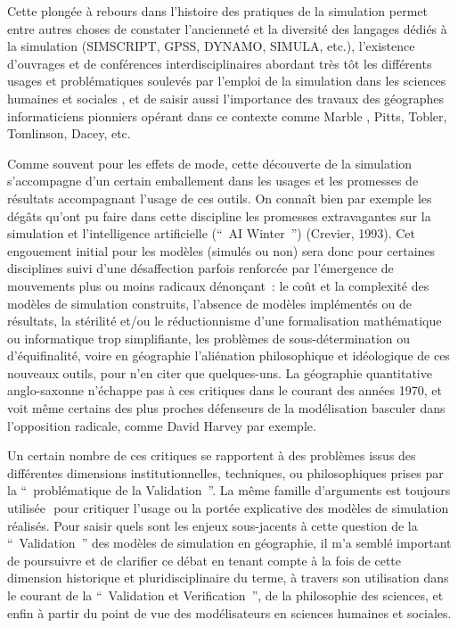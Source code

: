 Cette plongée à rebours dans l'histoire des pratiques de la simulation permet entre autres choses de constater l'ancienneté et la diversité des langages dédiés à la simulation (SIMSCRIPT, GPSS, DYNAMO, SIMULA, etc.), l'existence  d'ouvrages et de conférences interdisciplinaires abordant très tôt les différents usages et problématiques soulevés par l'emploi de la simulation dans les sciences humaines et sociales \autocites{Shubik1960, Borko1962, Guetzkow1962, Beshers1965, Guetzkow1972, Shubik1972, Morgan2004, Dutton1971}⁠⁠, et de saisir aussi l'importance des travaux des géographes informaticiens pionniers opérant dans ce contexte comme Marble , Pitts, Tobler, Tomlinson, Dacey, etc. \autocites{Marble2010, Marble1972}

Comme souvent pour les effets de mode, cette découverte de la simulation  s'accompagne d'un certain emballement dans les usages et les promesses de résultats accompagnant l'usage de ces outils. On connaît bien par exemple les dégâts qu'ont pu faire dans cette discipline les promesses extravagantes sur la simulation et l'intelligence artificielle (\foreignquote{english}{ AI Winter }) (Crevier, 1993). Cet engouement initial pour les modèles (simulés ou  non) sera donc pour certaines disciplines suivi d'une désaffection parfois renforcée par l'émergence de mouvements plus ou moins radicaux dénonçant : le coût et la complexité des modèles de simulation construits, l'absence de modèles implémentés ou de résultats, la stérilité et/ou le réductionnisme d'une formalisation mathématique ou informatique trop simplifiante, les problèmes de sous-détermination ou d'équifinalité, voire en géographie l'aliénation philosophique et idéologique de ces nouveaux outils, pour n'en citer que quelques-uns. La géographie quantitative anglo-saxonne n'échappe pas à ces critiques dans le courant des années 1970, et voit même certains des plus proches défenseurs de la modélisation basculer dans l'opposition radicale, comme David Harvey par exemple.

Un certain nombre de ces critiques se rapportent à des problèmes issus des différentes dimensions institutionnelles, techniques, ou philosophiques prises par la \enquote{ problématique de la Validation }. La même famille d'arguments est toujours utilisée \autocites{Amblard2006, Waldherr2013}⁠ pour critiquer l'usage ou la portée explicative des modèles de simulation réalisés. Pour saisir quels sont les enjeux sous-jacents à cette question de la \enquote{ Validation } des modèles de simulation en géographie, il m'a semblé important de poursuivre et de clarifier ce débat en tenant compte à la fois de cette dimension historique et pluridisciplinaire du terme, à travers son utilisation dans le courant de la \enquote{ Validation et Verification }, de la philosophie des sciences, et enfin à partir du point de vue des modélisateurs en sciences humaines et sociales. 

